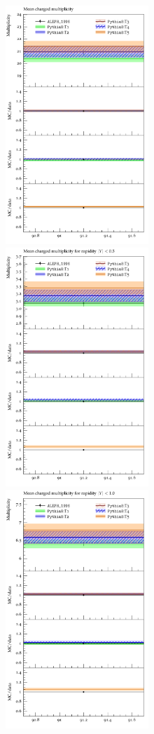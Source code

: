 \documentclass[aps,preprint,floatfix,nofootinbib,showpacs]{revtex4-1}
\begin{document}
\begin{figure}[btp]
 \centering
 \includegraphics[width=8cm, height=9cm]{ALEPH_1996/d19-x01-y01.pdf}
 \hfill
  \includegraphics[width=8cm, height=9cm]{ALEPH_1996/d20-x01-y01.pdf}
  \vfill
   \includegraphics[width=8cm, height=9cm]{ALEPH_1996/d21-x01-y01.pdf}

\end{figure}
\end{document}
